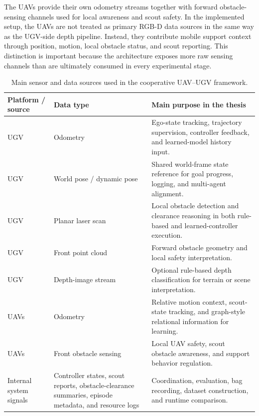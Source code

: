 The UAVs provide their own odometry streams together with forward obstacle-sensing channels used for local awareness and scout safety. In the implemented setup, the UAVs are not treated as primary RGB-D data sources in the same way as the UGV-side depth pipeline. Instead, they contribute mobile support context through position, motion, local obstacle status, and scout reporting. This distinction is important because the architecture exposes more raw sensing channels than are ultimately consumed in every experimental stage.

\begin{table}[tbp]
    \caption{Main sensor and data sources used in the cooperative UAV--UGV framework.}
    \label{tab:sensor_data_summary}
    \centering
    \small
    \setlength{\tabcolsep}{4pt}
    \renewcommand{\arraystretch}{1.15}
    \begin{tabularx}{\textwidth}{@{}>{\raggedright\arraybackslash}p{}>{\raggedright\arraybackslash}p{}X@{}}
        \toprule
        \textbf{Platform / source} & \textbf{Data type} & \textbf{Main purpose in the thesis} \\
        \midrule
        UGV & Odometry & Ego-state tracking, trajectory supervision, controller feedback, and learned-model history input. \\
        UGV & World pose / dynamic pose & Shared world-frame state reference for goal progress, logging, and multi-agent alignment. \\
        UGV & Planar laser scan & Local obstacle detection and clearance reasoning in both rule-based and learned-controller execution. \\
        UGV & Front point cloud & Forward obstacle geometry and local safety interpretation. \\
        UGV & Depth-image stream & Optional rule-based depth classification for terrain or scene interpretation. \\
        UAVs & Odometry & Relative motion context, scout-state tracking, and graph-style relational information for learning. \\
        UAVs & Front obstacle sensing & Local UAV safety, scout obstacle awareness, and support behavior regulation. \\
        Internal system signals & Controller states, scout reports, obstacle-clearance summaries, episode metadata, and resource logs & Coordination, evaluation, bag recording, dataset construction, and runtime comparison. \\
        \bottomrule
    \end{tabularx}
\end{table}

